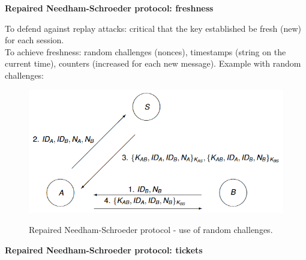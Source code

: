 \documentclass{article}
\begin{document}
\textbf{Repaired Needham-Schroeder protocol: freshness}

To defend against replay attacks: critical that the key established be fresh (new) for each session.\\
To achieve freshness: random challenges (nonces), timestamps (string on the current time), counters (increased for each new message).
Example with random challenges:

\begin{figure}[H]
\centering
\includegraphics[scale=0.7]{Images/reparedneedhamschroeder.png}
\label{fig:fround}
\caption{Repaired Needham-Schroeder protocol - use of random challenges.}
\end{figure}

\textbf{Repaired Needham-Schroeder protocol: tickets}
\end{document}
